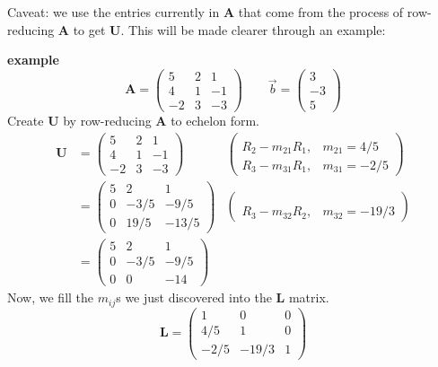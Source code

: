 \documentclass[12pt]{article}
\newcommand{\ve}[1]{\ensuremath{\mathbf{#1}}}
\begin{document}
Caveat: we use the entries currently in $\ve{A}$ that come from the process of row-reducing $\ve{A}$ to get $\ve{U}$. This will be made clearer through an example:

\textbf{example}
\begin{equation}
\ve{A} = \begin{pmatrix}
  5  & 2 & 1 \\
  4  & 1 & -1 \\
  -2 & 3 & -3
\end{pmatrix}
\qquad 
\vec{b}= \begin{pmatrix}
3 \\ -3 \\ 5
\end{pmatrix} \nonumber
\end{equation}
%
%
Create $\ve{U}$ by row-reducing $\ve{A}$ to echelon form. 
\begin{align}
\ve{U} &= \begin{pmatrix}
  5  & 2 & 1 \\
  4  & 1 & -1 \\
  -2 & 3 & -3
\end{pmatrix} 
&\begin{pmatrix}
 & \\ R_2 - m_{21}R_1, & m_{21} = 4/5 \\ 
      R_3 - m_{31}R_1, & m_{31} = -2/5 \end{pmatrix} \nonumber \\
%
&= \begin{pmatrix}
  5 & 2    & 1 \\
  0 & -3/5 & -9/5 \\
  0 & 19/5 & -13/5
\end{pmatrix} 
&\begin{pmatrix}
 & \\ & \\ R_3 - m_{32}R_2, & m_{32} = -19/3 \end{pmatrix} \nonumber \\                   
%
&= \begin{pmatrix}
  5 & 2    & 1 \\
  0 & -3/5 & -9/5 \\
  0 & 0    & -14
\end{pmatrix} \nonumber
\end{align}
%
Now, we fill the $m_{ij}$s we just discovered into the $\ve{L}$ matrix.
%
\begin{equation}
\ve{L} = \begin{pmatrix}
  1    & 0     & 0 \\
  4/5  & 1     & 0 \\
  -2/5 & -19/3 & 1
\end{pmatrix} \nonumber
\end{equation}
\end{document}
